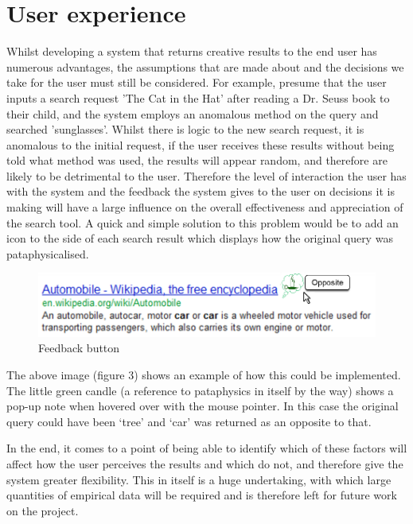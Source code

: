 \section{User experience}

Whilst developing a system that returns creative results to the end user has numerous advantages, the assumptions that are made about and the decisions we take for the user must still be considered. For example, presume that the user inputs a search request 'The Cat in the Hat' after reading a Dr. Seuss book to their child, and the system employs an anomalous method on the query and searched 'sunglasses'. Whilst there is logic to the new search request, it is anomalous to the initial request, if the user receives these results without being told what method was used, the results will appear random, and therefore are likely to be detrimental to the user. Therefore the level of interaction the user has with the system and the feedback the system gives to the user on decisions it is making will have a large influence on the overall effectiveness and appreciation of the search tool. A quick and simple solution to this problem would be to add an icon to the side of each search result which displays how the original query was pataphysicalised.

\begin{figure}[htb] %
  \centering
  \includegraphics[width=\linewidth]{images/resultexample}
\caption[Feedback button]{Feedback button}
\label{fig:feedback}
\end{figure}

The above image (figure 3) shows an example of how this could be implemented. The little green candle (a reference to pataphysics in itself by the way) shows a pop-up note when hovered over with the mouse pointer. In this case the original query could have been ‘tree’ and ‘car’ was returned as an opposite to that.

In the end, it comes to a point of being able to identify which of these factors will affect how the user perceives the results and which do not, and therefore give the system greater flexibility. This in itself is a huge undertaking, with which large quantities of empirical data will be required and is therefore left for future work on the project.


